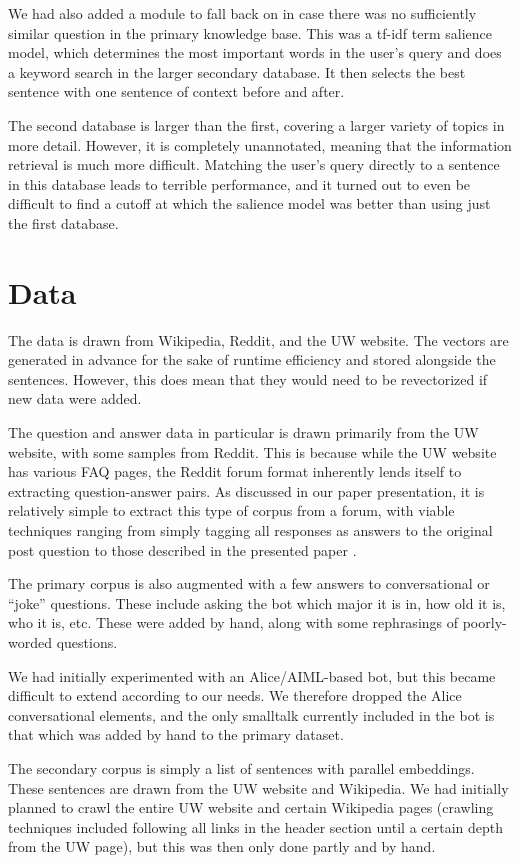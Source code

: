 \documentclass[11pt]{article}
\begin{document}
We had also added a module to fall back on in case there was no sufficiently similar question in the primary knowledge base. This was a tf-idf term salience model, which determines the most important words in the user's query and does a keyword search in the larger secondary database. It then selects the best sentence with one sentence of context before and after.

The second database is larger than the first, covering a larger variety of topics in more detail. However, it is completely unannotated, meaning that the information retrieval is much more difficult. Matching the user's query directly to a sentence in this database leads to terrible performance, and it turned out to even be difficult to find a cutoff at which the salience model was better than using just the first database.

\section{Data}

The data is drawn from Wikipedia, Reddit, and the UW website. The vectors are generated in advance for the sake of runtime efficiency and stored alongside the sentences. However, this does mean that they would need to be revectorized if new data were added.

The question and answer data in particular is drawn primarily from the UW website, with some samples from Reddit. This is because while the UW website has various FAQ pages, the Reddit forum format inherently lends itself to extracting question-answer pairs. As discussed in our paper presentation, it is relatively simple to extract this type of corpus from a forum, with viable techniques ranging from simply tagging all responses as answers to the original post question to those described in the presented paper \cite{huang}.

The primary corpus is also augmented with a few answers to conversational or ``joke'' questions. These include asking the bot which major it is in, how old it is, who it is, etc. These were added by hand, along with some rephrasings of poorly-worded questions.

We had initially experimented with an Alice/AIML-based bot, but this became difficult to extend according to our needs. We therefore dropped the Alice conversational elements, and the only smalltalk currently included in the bot is that which was added by hand to the primary dataset.

The secondary corpus is simply a list of sentences with parallel embeddings. These sentences are drawn from the UW website and Wikipedia. We had initially planned to crawl the entire UW website and certain Wikipedia pages (crawling techniques included following all links in the header section until a certain depth from the UW page), but this was then only done partly and by hand.
\end{document}
